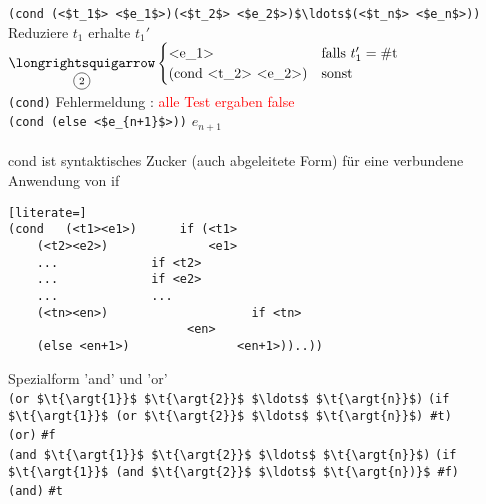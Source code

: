 \lstinline[mathescape]!(cond (<$t_1$> <$e_1$>)(<$t_2$> <$e_2$>)$\ldots$(<$t_n$> <$e_n$>))!\\
 Reduziere $t_1$ erhalte $t_1'$ $\underset{\t{\circled{2}}}{\t{\eval}} \begin{cases}
\t{\lstinline[mathescape]!<e_1>!} & \t{falls }t_1' = \t{\lstinline!#t!}\\
(\t{\lstinline[mathescape]!cond <t_2> <e_2>)!} & \t{sonst}
\end{cases}$\\
\lstinline[mathescape]!(cond)! \eval \glqq Fehlermeldung : \textcolor{red}{alle Test ergaben false} \grqq\\
\lstinline[mathescape]!(cond (else <$e_{n+1}$>))! \eval $e_{n+1}$\\
\bigskip\\
cond ist syntaktisches Zucker (auch abgeleitete Form) für eine verbundene Anwendung von if \\
\begin{lstlisting}[literate=]
(cond 	(<t1><e1>) 		if (<t1>
	(<t2><e2>)	    	    <e1>
	...				if <t2>
	...				if <e2>
	...				...
	(<tn><en>)       	    	  if <tn>
					     <en>
	(else <en+1>)  	 			<en+1>))..))
\end{lstlisting}
Spezialform 'and' und 'or' \\
\lstinline[mathescape]!(or $\t{\argt{1}}$ $\t{\argt{2}}$ $\ldots$ $\t{\argt{n}}$)! \eval \lstinline[mathescape]!(if $\t{\argt{1}}$ (or $\t{\argt{2}}$ $\ldots$ $\t{\argt{n}}$) #t)!\\
\lstinline[mathescape]!(or)! \eval \lstinline[mathescape]!#f! \\
\lstinline[mathescape]!(and $\t{\argt{1}}$ $\t{\argt{2}}$ $\ldots$ $\t{\argt{n}}$)! \eval \lstinline[mathescape]!(if $\t{\argt{1}}$ (and $\t{\argt{2}}$ $\ldots$ $\t{\argt{n})}$ #f)!\\
\lstinline[mathescape]!(and)! \eval \lstinline[mathescape]!#t!
\newpage
{}
